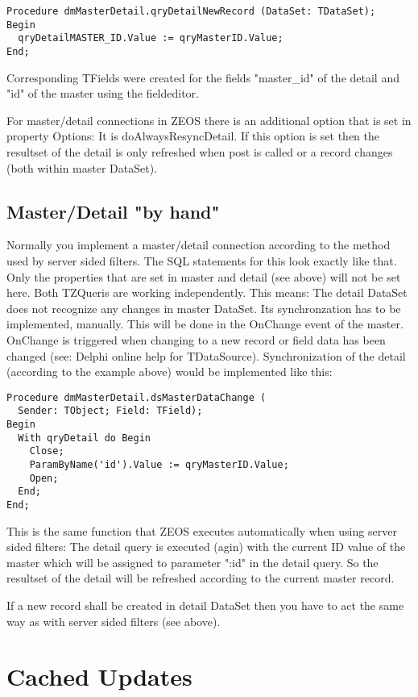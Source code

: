 \documentclass[a4paper,12pt,oneside]{book}
\begin{document}
\begin{verbatim}
Procedure dmMasterDetail.qryDetailNewRecord (DataSet: TDataSet);
Begin
  qryDetailMASTER_ID.Value := qryMasterID.Value;
End;
\end{verbatim}

Corresponding TFields were created for the fields "master\_id" of the detail and "id" of the master using the fieldeditor.

For master/detail connections in ZEOS there is an additional option that is set in property Options: It is doAlwaysResyncDetail.
If this option is set then the resultset of the detail is only refreshed when post is called or a record changes (both within master DataSet).

\section{Master/Detail "by hand"}
Normally you implement a master/detail connection according to the method used by server sided filters.
The SQL statements for this look exactly like that.
Only the properties that are set in master and detail (see above) will not be set here.
Both TZQueris are working independently.
This means: The detail DataSet does not recognize any changes in master DataSet.
Its synchronzation has to be implemented, manually.
This will be done in the OnChange event of the master.
OnChange is triggered when changing to a new record or field data has been changed (see: Delphi online help for TDataSource).
Synchronization of the detail (according to the example above) would be implemented like this:

\begin{verbatim}
Procedure dmMasterDetail.dsMasterDataChange (
  Sender: TObject; Field: TField);
Begin
  With qryDetail do Begin
    Close;
    ParamByName('id').Value := qryMasterID.Value;
    Open;
  End;
End;
\end{verbatim}

This is the same function that ZEOS executes automatically when using server sided filters:
The detail query is executed (agin) with the current ID value of the master which will be assigned to parameter ":id" in the detail query.
So the resultset of the detail will be refreshed according to the current master record.

If a new record shall be created in detail DataSet then you have to act the same way as with server sided filters (see above).

\chapter{Cached Updates}
\end{document}
